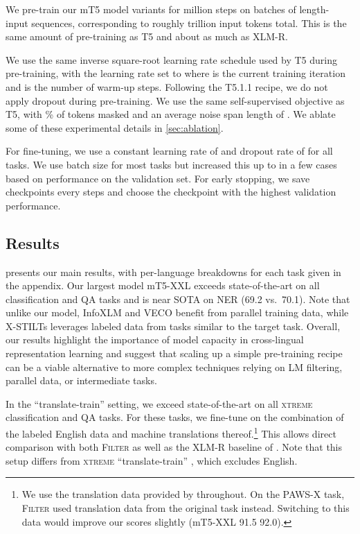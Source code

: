 \documentclass[11pt]{article}
\begin{document}
We pre-train our mT5 model variants for  million steps on batches of  length- input sequences, corresponding to roughly  trillion input tokens total.
This is the same amount of pre-training as T5 and about  as much as XLM-R.


We use the same inverse square-root learning rate schedule used by T5 during pre-training, with the learning rate set to  where  is the current training iteration and  is the number of warm-up steps.
Following the T5.1.1 recipe, we do not apply dropout during pre-training.
We use the same self-supervised objective as T5, with \% of tokens masked and an average noise span length of .
We ablate some of these experimental details in \cref{sec:ablation}.

For fine-tuning, we use a constant learning rate of  and dropout rate of  for all tasks.
We use batch size  for most tasks but increased this up to  in a few cases based on performance on the validation set.
For early stopping, we save checkpoints every  steps and choose the checkpoint with the highest validation performance.

\subsection{Results}

 presents our main results, with per-language breakdowns for each task given in the appendix.
Our largest model mT5-XXL exceeds state-of-the-art on all classification and QA tasks and is near SOTA on NER (69.2 vs.~70.1).
Note that unlike our model, InfoXLM \citep{chi2020infoxlm} and VECO \citep{luo2020veco} benefit from parallel training data, while X-STILTs \citep{phang2020english} leverages labeled data from tasks similar to the target task.
Overall, our results highlight the importance of model capacity in cross-lingual representation learning and suggest that scaling up a simple pre-training recipe can be a viable alternative to more complex techniques relying on LM filtering, parallel data, or intermediate tasks.

In the ``translate-train'' setting, we exceed state-of-the-art on all \textsc{xtreme} classification and QA tasks.
For these tasks, we fine-tune on the combination of the labeled English data and machine translations thereof.\footnote{We use the translation data provided by \citet{hu2020xtreme} throughout. On the PAWS-X task, \textsc{Filter} used translation data from the original task instead. Switching to this data would improve our scores slightly (mT5-XXL 91.5  92.0).}
This allows direct comparison with both \textsc{Filter} \citep{fang2020filter} as well as the XLM-R baseline of \citet{fang2020filter}.
Note that this setup differs from \textsc{xtreme} ``translate-train'' \citep{hu2020xtreme}, which excludes  English.
\end{document}
